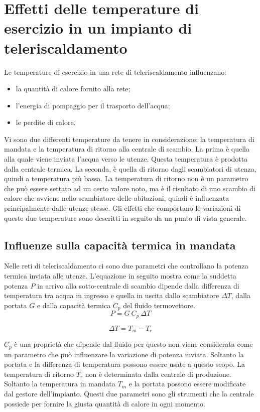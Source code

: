 \documentclass[laurea,oneside,11pt]{USiena_tesiLM}
\begin{document}
\section{Effetti delle temperature di esercizio in un impianto di teleriscaldamento}
Le temperature di esercizio in una rete di teleriscaldamento  influenzano:
\begin{itemize}
\item la quantità di calore fornito alla rete;
\item l'energia di pompaggio per il trasporto dell'acqua;
\item le perdite di calore.
\end{itemize}

Vi sono due differenti temperature da tenere in considerazione: la temperatura di mandata e la temperatura di ritorno alla centrale di scambio. La prima è quella alla quale viene inviata l'acqua verso le utenze. Questa temperatura è prodotta dalla centrale termica. La seconda, è quella di ritorno dagli scambiatori di utenza, quindi a temperatura più bassa. La temperatura di ritorno non è un parametro che può essere settato ad un certo valore noto, ma è il risultato di uno scambio di calore che avviene nello scambiatore delle abitazioni, quindi è influenzata principalmente dalle utenze stesse.
Gli effetti che comportano le variazioni di queste due temperature sono descritti in seguito da un punto di vista generale. 

\subsection{Influenze sulla capacità termica in mandata}
Nelle reti di teleriscaldamento ci sono due parametri che controllano la potenza termica inviata alle utenze. L'equazione in seguito mostra come la suddetta potenza $P$ in arrivo alla sotto-centrale di scambio dipende dalla differenza di temperatura tra acqua in ingresso e quella in uscita dallo scambiatore $\Delta T$, dalla portata $G$ e dalla capacità termica $C_p$ del fluido termovettore.
\begin{equation}
P = G \ C_p \ \Delta T 
\label{eq:Potenza}
\end{equation} 

\begin{equation}
\Delta T = T_{m} - T_{r}
\label{eq:dT}
\end{equation}

$C_p$ è una proprietà che dipende dal fluido per questo non viene considerata come un parametro che può influenzare la variazione di potenza inviata. Soltanto la portata e la differenza di temperatura   possono essere usate a questo scopo. La temperatura di ritorno $T_{r}$ non è determinata dalla centrale di produzione. Soltanto la temperatura in mandata $T_{m}$ e la portata possono essere modificate dal gestore dell'impianto.
Questi due parametri sono gli strumenti che la centrale possiede per fornire la giusta quantità di calore in ogni momento.
\end{document}
